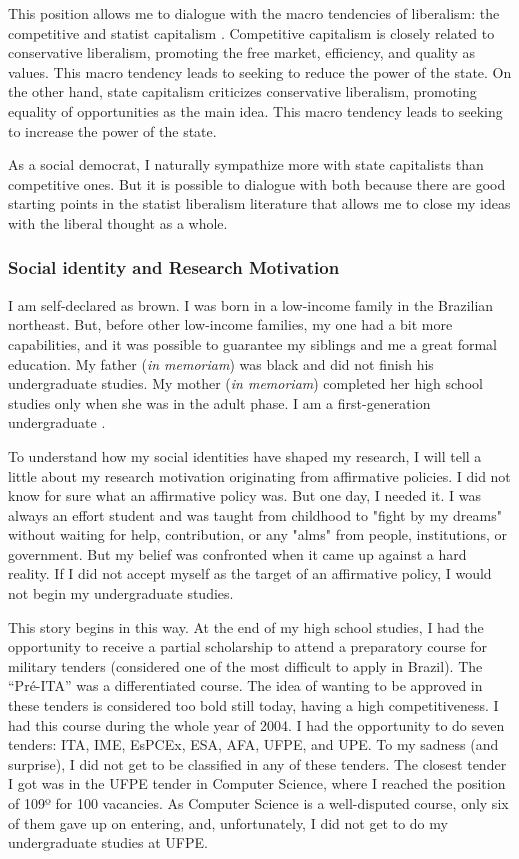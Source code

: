 This position allows me to dialogue with the macro tendencies of liberalism: the competitive and statist capitalism \cite[pp.~84-95]{libaneo:2011}. Competitive capitalism is closely related to conservative liberalism, promoting the free market, efficiency, and quality as values. This macro tendency leads to seeking to reduce the power of the state. On the other hand, state capitalism criticizes conservative liberalism, promoting equality of opportunities as the main idea. This macro tendency leads to seeking to increase the power of the state. 

As a social democrat, I naturally sympathize more with state capitalists than competitive ones. But it is possible to dialogue with both because there are good starting points in the statist liberalism literature that allows me to close my ideas with the liberal thought as a whole.

\subsubsection{Social identity and Research Motivation}

I am self-declared as brown. I was born in a low-income family in the Brazilian northeast. But, before other low-income families, my one had a bit more capabilities, and it was possible to guarantee my siblings and me a great formal education. My father (\textit{in memoriam}) was black and did not finish his undergraduate studies. My mother (\textit{in memoriam}) completed her high school studies only when she was in the adult phase. I am a first-generation undergraduate \cite{ives:2020}.

To understand how my social identities have shaped my research, I will tell a little about my research motivation originating from affirmative policies. I did not know for sure what an affirmative policy was. But one day, I needed it. I was always an effort student and was taught from childhood to "fight by my dreams" without waiting for help, contribution, or any "alms" from people, institutions, or government. But my belief was confronted when it came up against a hard reality. If I did not accept myself as the target of an affirmative policy, I would not begin my undergraduate studies.

This story begins in this way. At the end of my high school studies, I had the opportunity to receive a partial scholarship to attend a preparatory course for military tenders (considered one of the most difficult to apply in Brazil). The “Pré-ITA” was a differentiated course. The idea of wanting to be approved in these tenders is considered too bold still today, having a high competitiveness. I had this course during the whole year of 2004. I had the opportunity to do seven tenders: ITA, IME, EsPCEx, ESA, AFA, UFPE, and UPE. To my sadness (and surprise), I did not get to be classified in any of these tenders. The closest tender I got was in the UFPE tender in Computer Science, where I reached the position of 109º for 100 vacancies. As Computer Science is a well-disputed course, only six of them gave up on entering, and, unfortunately, I did not get to do my undergraduate studies at UFPE.

